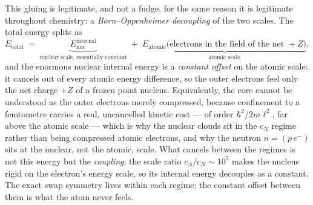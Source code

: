 \documentclass[11pt]{article}
\begin{document}
This gluing is legitimate, and not a fudge, for the same reason it is legitimate throughout chemistry:
a \emph{Born--Oppenheimer decoupling} of the two scales. The total energy splits as
\begin{equation}
E_{\text{total}} \;=\; \underbrace{E^{\text{internal}}_{\text{nuc}}}_{\text{nuclear scale, essentially constant}}
\;+\; \underbrace{E_{\text{atomic}}\big(\text{electrons in the field of the net }+Z\big)}_{\text{atomic scale}} ,
\end{equation}
and the enormous nuclear internal energy is a \emph{constant offset} on the atomic scale: it cancels
out of every atomic energy difference, so the outer electrons feel only the net charge $+Z$ of a
frozen point nucleus. Equivalently, the core cannot be understood as the outer electrons merely
compressed, because confinement to a femtometre carries a real, uncancelled kinetic cost --- of order
$\hbar^2/2m\ell^2$, far above the atomic scale --- which is why the nuclear clouds sit in the $c_N$
regime rather than being compressed atomic electrons, and why the neutron $n=(p\,e^-)$ sits at the
nuclear, not the atomic, scale. What cancels between the regimes is not this energy but the \emph{coupling}: the
scale ratio $c_A/c_N\sim10^5$ makes the nucleus rigid on the electron's energy scale, so its internal
energy decouples as a constant. The exact swap symmetry lives within each regime; the constant offset
between them is what the atom never feels.
\end{document}
